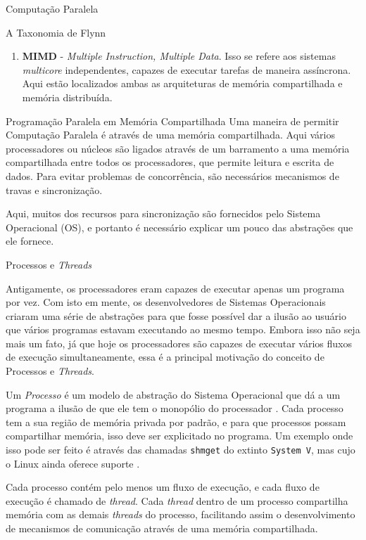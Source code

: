 \begin{section}{Computação Paralela}
\begin{subsection}{A Taxonomia de Flynn}
\begin{enumerate}
    \item \textbf{MIMD} - \textit{Multiple Instruction, Multiple Data}. Isso se refere
        aos sistemas \textit{multicore} independentes, capazes de executar tarefas
        de maneira assíncrona. Aqui estão localizados ambas as arquiteturas de memória
        compartilhada e memória distribuída.
\end{enumerate}
\end{subsection}

\begin{subsection}{Programação Paralela em Memória Compartilhada}
	Uma maneira de permitir Computação Paralela é através de
uma memória compartilhada. Aqui vários processadores ou núcleos
são ligados através de um barramento a uma memória compartilhada entre
todos os processadores, que permite leitura e escrita de dados.
Para evitar problemas de concorrência, são necessários mecanismos de
travas e sincronização.

	 Aqui, muitos dos recursos para sincronização são fornecidos pelo
Sistema Operacional (OS), e portanto é necessário explicar um pouco
das abstrações que ele fornece.

\begin{subsubsection}{Processos e \textit{Threads}}

	Antigamente, os processadores eram capazes de executar apenas
um programa por vez. Com isto em mente, os desenvolvedores
de Sistemas Operacionais criaram uma série de abstrações para que fosse
possível dar a ilusão ao usuário que vários programas estavam executando
ao mesmo tempo. Embora isso não seja mais um fato, já que hoje os processadores
são capazes de executar vários fluxos de execução simultaneamente, essa
é a principal motivação do conceito de Processos e \textit{Threads}.

	Um \textit{Processo} é um modelo de abstração do Sistema Operacional que
dá a um programa a ilusão de que ele tem o monopólio do processador
\citep{love:2005}. Cada processo tem a sua região de memória privada por
padrão, e para que processos possam compartilhar memória, isso deve ser 
explicitado no programa. Um exemplo onde isso pode ser feito é através das
chamadas \texttt{shmget} do extinto \texttt{System V}, mas cujo o Linux ainda
oferece suporte \citep{shmget}.

Cada processo contém pelo menos um fluxo de execução, e cada fluxo de
execução é chamado de \textit{thread}. Cada \textit{thread} dentro
de um processo compartilha memória com as demais \textit{threads}
do processo, facilitando assim o desenvolvimento de mecanismos de
comunicação através de uma memória compartilhada.


\end{subsubsection}
\end{subsection}
\end{section}
